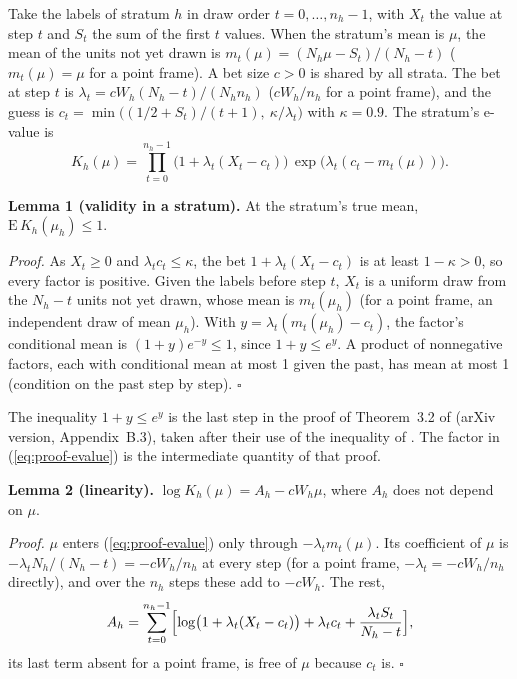 \documentclass[11pt,a4paper]{article}
\begin{document}
Take the labels of stratum $h$ in draw order $t = 0, \dots, n_h - 1$, with $X_t$ the value at step $t$ and $S_t$ the
sum of the first $t$ values. When the stratum's mean is $\mu$, the mean of the units not yet drawn is
$m_t(\mu) = (N_h \mu - S_t)/(N_h - t)$ ($m_t(\mu) = \mu$ for a point frame). A bet size $c > 0$ is shared by all
strata. The bet at step $t$ is $\lambda_t = c W_h (N_h - t)/(N_h n_h)$ ($c W_h/n_h$ for a point frame), and the guess
is $c_t = \min\bigl((1/2 + S_t)/(t+1),\ \kappa/\lambda_t\bigr)$ with $\kappa = 0.9$. The stratum's e-value is
\begin{equation}
  K_h(\mu) = \prod_{t=0}^{n_h - 1} \bigl(1 + \lambda_t (X_t - c_t)\bigr)\,
  \exp\bigl(\lambda_t (c_t - m_t(\mu))\bigr).
  \label{eq:proof-evalue}
\end{equation}

\textbf{Lemma 1 (validity in a stratum).} At the stratum's true mean, $\mathrm{E}\,K_h(\mu_h) \le 1$.

\textit{Proof.} As $X_t \ge 0$ and $\lambda_t c_t \le \kappa$, the bet $1 + \lambda_t (X_t - c_t)$ is at least
$1 - \kappa > 0$, so every factor is positive. Given the labels before step $t$, $X_t$ is a uniform draw from the
$N_h - t$ units not yet drawn, whose mean is $m_t(\mu_h)$ (for a point frame, an independent draw of mean $\mu_h$).
With $y = \lambda_t (m_t(\mu_h) - c_t)$, the factor's conditional mean is $(1 + y)e^{-y} \le 1$, since
$1 + y \le e^y$. A product of nonnegative factors, each with conditional mean at most 1 given the past, has mean at
most 1 (condition on the past step by step). $\square$

The inequality $1 + y \le e^y$ is the last step in the proof of Theorem~3.2 of \citet{waudbysmith2020} (arXiv
version, Appendix~B.3), taken after their use of the inequality of \citet{fan2015}. The factor in
(\ref{eq:proof-evalue}) is the intermediate quantity of that proof.

\textbf{Lemma 2 (linearity).} $\log K_h(\mu) = A_h - c W_h \mu$, where $A_h$ does not depend on $\mu$.

\textit{Proof.} $\mu$ enters (\ref{eq:proof-evalue}) only through $-\lambda_t m_t(\mu)$. Its coefficient of $\mu$ is
$-\lambda_t N_h / (N_h - t) = -c W_h / n_h$ at every step (for a point frame, $-\lambda_t = -c W_h / n_h$ directly),
and over the $n_h$ steps these add to $-c W_h$. The rest,
\[
  A_h = \sum_{t=0}^{n_h - 1} \Bigl[\log\bigl(1 + \lambda_t (X_t - c_t)\bigr) + \lambda_t c_t
  + \frac{\lambda_t S_t}{N_h - t}\Bigr],
\]
its last term absent for a point frame, is free of $\mu$ because $c_t$ is. $\square$
\end{document}
